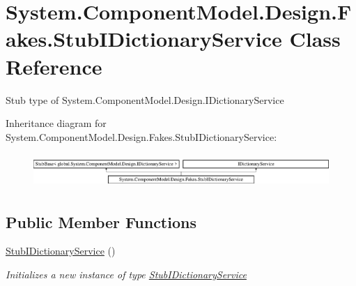 \hypertarget{class_system_1_1_component_model_1_1_design_1_1_fakes_1_1_stub_i_dictionary_service}{\section{System.\-Component\-Model.\-Design.\-Fakes.\-Stub\-I\-Dictionary\-Service Class Reference}
\label{class_system_1_1_component_model_1_1_design_1_1_fakes_1_1_stub_i_dictionary_service}
}


Stub type of System.\-Component\-Model.\-Design.\-I\-Dictionary\-Service 


Inheritance diagram for System.\-Component\-Model.\-Design.\-Fakes.\-Stub\-I\-Dictionary\-Service\-:\begin{figure}[H]
\begin{center}
\leavevmode
\includegraphics[height=1.305361cm]{class_system_1_1_component_model_1_1_design_1_1_fakes_1_1_stub_i_dictionary_service}
\end{center}
\end{figure}
\subsection*{Public Member Functions}
\begin{DoxyCompactItemize}
\item 
\hyperlink{class_system_1_1_component_model_1_1_design_1_1_fakes_1_1_stub_i_dictionary_service_acd8a795bc80a79cf3e1e3105ebd03f5d}{Stub\-I\-Dictionary\-Service} ()
\begin{DoxyCompactList}\small\item\em Initializes a new instance of type \hyperlink{class_system_1_1_component_model_1_1_design_1_1_fakes_1_1_stub_i_dictionary_service}{Stub\-I\-Dictionary\-Service}\end{DoxyCompactList}\end{DoxyCompactItemize}

